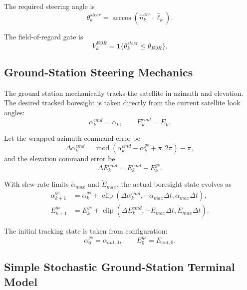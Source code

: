 \documentclass[11pt]{article}
\newcommand{\clip}{\operatorname{clip}}
\begin{document}
The required steering angle is
\begin{equation}
  \theta^{steer}_k = \arccos \left( \hat{n}^{arr}_k \cdot \hat{\ell}_k \right).
\end{equation}

The field-of-regard gate is
\begin{equation}
  V^{FOR}_k = \mathbf{1}\{\theta^{steer}_k \le \theta_{FOR}\}.
\end{equation}

\subsection{Ground-Station Steering Mechanics}

The ground station mechanically tracks the satellite in azimuth and elevation.
The desired tracked boresight is taken directly from the current satellite look angles:
\begin{equation}
  \alpha^{cmd}_k = \alpha_k,
  \qquad
  E^{cmd}_k = E_k.
\end{equation}

Let the wrapped azimuth command error be
\begin{equation}
  \Delta \alpha^{cmd}_k
  =
  \operatorname{mod}\left(\alpha^{cmd}_k - \alpha^{gs}_k + \pi, 2\pi\right) - \pi,
\end{equation}
and the elevation command error be
\begin{equation}
  \Delta E^{cmd}_k = E^{cmd}_k - E^{gs}_k.
\end{equation}

With slew-rate limits $\dot{\alpha}_{max}$ and $\dot{E}_{max}$, the actual boresight
state evolves as
\begin{align}
  \alpha^{gs}_{k+1}
  &=
  \alpha^{gs}_k
  +
  \clip\left(
    \Delta \alpha^{cmd}_k,
    -\dot{\alpha}_{max}\Delta t,
    \dot{\alpha}_{max}\Delta t
  \right), \\
  E^{gs}_{k+1}
  &=
  E^{gs}_k
  +
  \clip\left(
    \Delta E^{cmd}_k,
    -\dot{E}_{max}\Delta t,
    \dot{E}_{max}\Delta t
  \right).
\end{align}

The initial tracking state is taken from configuration:
\begin{equation}
  \alpha^{gs}_0 = \alpha_{ant,0},
  \qquad
  E^{gs}_0 = E_{ant,0}.
\end{equation}

\subsection{Simple Stochastic Ground-Station Terminal Model}
\end{document}
